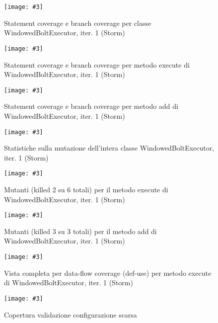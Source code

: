 \documentclass[10pt, a4paper]{article}
\newcommand{\getpicturelabel}[1]{picture:#1}
\newcommand{\makepicture}[4]{
	\begin{figure}[H]
	\centering
	\texttt{[image: \#3]}
	\caption{#4}
	\label{\getpicturelabel{#3}}
	\end{figure}
}
\newcommand{\alldfcovcaption}[4]{Vista completa per data-flow coverage (def-use) per metodo #1 di #2, iter. #3 (#4)}
\newcommand{\methodcfcovcaption}[4]{Statement coverage e branch coverage per metodo #1 di #2, iter. #3 (#4)}
\newcommand{\classcfcovcaption}[3]{Statement coverage e branch coverage per classe #1, iter. #2 (#3)}
\newcommand{\mutclasscaption}[3]{Statistiche sulla mutazione dell'intera classe #1, iter. #2 (#3)}
\newcommand{\mutmethodcaption}[6]{Mutanti (killed #5 su #6 totali) per il metodo #1 di #2, iter. #3 (#4)}
\def\storm{Storm}
\begin{document}
	\makepicture{18cm}{0.75cm}{storm/controlflow-WindowedBoltExecutor-1}
				{\classcfcovcaption{WindowedBoltExecutor}{1}{\storm}}
				
	\makepicture{18cm}{0.5cm}{storm/controlflow-execute-WindowedBoltExecutor-1}
				{\methodcfcovcaption{execute}{WindowedBoltExecutor}{1}{\storm}}
				
	\makepicture{18cm}{0.5cm}{storm/controlflow-prepare-WindowedBoltExecutor-1}
				{\methodcfcovcaption{add}{WindowedBoltExecutor}{1}{\storm}}
				
	\makepicture{17cm}{1.5cm}{storm/mutation-WindowedBoltExecutor-1}
				{\mutclasscaption{WindowedBoltExecutor}{1}{\storm}}
				
	\makepicture{16.5cm}{8cm}{storm/mutation-execute-WindowedBoltExecutor-1}
				{\mutmethodcaption{execute}{WindowedBoltExecutor}{1}{\storm}{2}{6}}
	
	\makepicture{17cm}{8cm}{storm/mutation-prepare-WindowedBoltExecutor-1}
				{\mutmethodcaption{add}{WindowedBoltExecutor}{1}{\storm}{3}{3}}
				
	\makepicture{15cm}{15cm}{storm/dataflow-execute-WindowedBoltExecutor-1}
				{\alldfcovcaption{execute}{WindowedBoltExecutor}{1}{\storm}}
				
	\makepicture{17cm}{8cm}{storm/second-iter-WindowedBoltExecutor-reason}
				{Copertura validazione configurazione scarsa}
				
\end{document}
